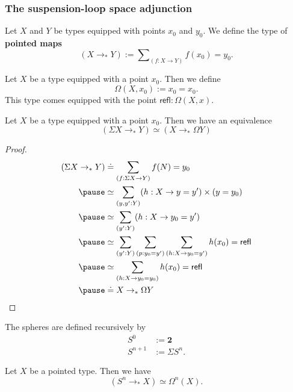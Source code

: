 \documentclass[handout]{beamer}
\newcommand{\sphere}[1]{S^{#1}}
\newcommand{\refl}{\mathsf{refl}}
\begin{document}
\begin{frame}
  \frametitle{The suspension-loop space adjunction}
  \begin{definition}
    Let $X$ and $Y$ be types equipped with points $x_0$ and $y_0$. We define the type of \textbf{pointed maps}
    \begin{equation*}
      (X\to_\ast Y):=\sum\nolimits_{(f:X\to Y)}f(x_0)=y_0.
    \end{equation*}
  \end{definition}

  \begin{definition}
    Let $X$ be a type equipped with a point $x_0$. Then we define
    \begin{equation*}
      \Omega(X,x_0):= x_0=x_0.
    \end{equation*}
    This type comes equipped with the point $\refl:\Omega(X,x)$. 
  \end{definition}
  
  \begin{theorem}
    Let $X$ be a type equipped with a point $x_0$. Then we have an equivalence
    \begin{equation*}
      (\Sigma X\to_\ast Y)\simeq (X\to_\ast\Omega Y)
    \end{equation*}
  \end{theorem}
\end{frame}

\begin{frame}
  \begin{proof}
    \begin{align*}
      (\Sigma X \to_\ast Y)
      & \doteq \sum_{(f:\Sigma X\to Y)}f(N)=y_0 \\ \pause
      & \simeq \sum_{(y,y':Y)}(h:X\to y=y')\times (y=y_0) \\ \pause
      & \simeq \sum_{(y':Y)}(h:X\to y_0=y') \\ \pause
      & \simeq \sum_{(y':Y)}\sum_{(p:y_0=y')}\sum_{(h:X\to y_0=y')}h(x_0)=\refl \\ \pause
      & \simeq \sum_{(h:X\to y_0=y_0)}h(x_0)=\refl \\ \pause
      & \doteq X\to_\ast \Omega Y\qedhere
    \end{align*}
  \end{proof}
\end{frame}

\begin{frame}
    \begin{definition}
    The spheres are defined recursively by
    \begin{align*}
      \sphere{0} & := \mathbf{2} \\
      \sphere{n+1} & :=\Sigma\sphere{n}.
    \end{align*}
  \end{definition}

  \begin{theorem}
    Let $X$ be a pointed type. Then we have
    \begin{equation*}
      (\sphere{n}\to_\ast X)\simeq \Omega^n(X).
    \end{equation*}
  \end{theorem}
\end{frame}
\end{document}
